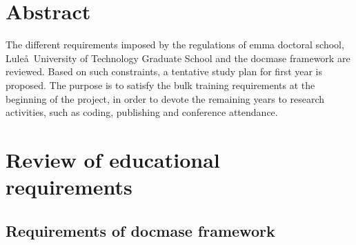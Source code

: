 \documentclass[a4paper, twoside,12pt, abstract]{scrartcl} %
\begin{document}
\clearscrheadings
\pagestyle{scrheadings}
\manualmark
\ofoot{\\ \pagemark} %
\ifoot{} %
\setheadtopline{2pt}
\setheadsepline{0.5pt}
\setfootsepline{0.5pt}

\section*{Abstract}

The different requirements imposed by the regulations of \acrshort{emma} doctoral school, Lule\aa\ University of Technology Graduate School and the \acrshort{docmase} framework are reviewed. Based on such constraints, a tentative study plan for first year is proposed. The purpose is to satisfy the bulk training requirements at the beginning of the project, in order to devote the remaining years to research activities, such as coding, publishing and conference attendance.  




\setcounter{page}{1}


\clearscrheadings
\pagestyle{scrheadings}
\manualmark
\ofoot{\\\pagemark} %
\ifoot{} %
\setheadtopline{2pt}
\setheadsepline{0.5pt}
\setfootsepline{0.5pt}

\section{Review of educational requirements}

\subsection{Requirements of \acrshort{docmase} framework}
\end{document}

